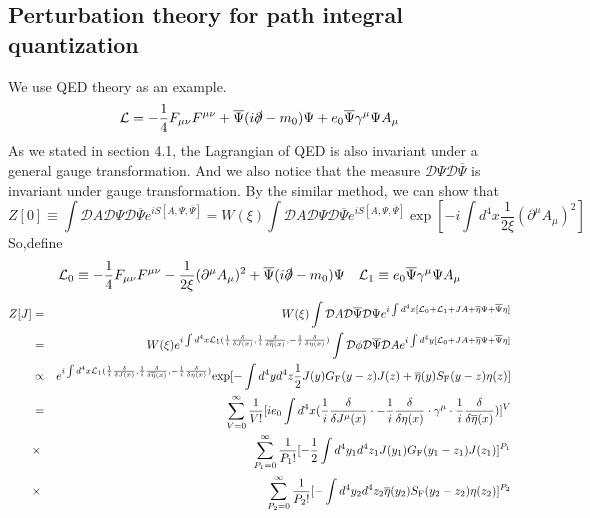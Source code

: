 \subsection{Perturbation theory for path integral quantization}
\noindent
We use QED theory as an example.
\[\mathcal{L} = -\frac{1}{4}F_{\mu\nu}F^{\mu\nu} + \overline{\Psi} (i\slashed{\partial}-m_0) \Psi + e_0\overline{\Psi}\gamma^{\mu}\Psi A_{\mu}\]
As we stated in section 4.1, the Lagrangian of QED is also invariant under a general gauge transformation. And we also notice that the measure $\mathcal{D}\Psi \mathcal{D}\overline{\Psi}$ is invariant under gauge transformation. By the similar method, we can show that
\[Z[0] \equiv \int \mathcal{D}A \mathcal{D}\Psi \mathcal{D}\overline{\Psi}e^{iS[A,\Psi,\overline{\Psi}]} = W(\xi)\int \mathcal{D}A \mathcal{D}\Psi \mathcal{D}\overline{\Psi}e^{iS[A,\Psi,\overline{\Psi}]} \exp\left[ -i \int d^4x \frac{1}{2\xi} (\partial^{\mu}A_{\mu})^2\right] \]
So,define
\[\mathcal{L}_0 \equiv -\frac{1}{4}F_{\mu\nu}F^{\mu\nu} - \frac{1}{2\xi} (\partial^{\mu}A_{\mu})^2 + \overline{\Psi} (i\slashed{\partial}-m_0) \Psi \quad \mathcal{L}_1 \equiv e_0\overline{\Psi}\gamma^{\mu}\Psi A_{\mu}\]
\begin{eqnarray}
Z[J] &=& W(\xi) \int \mathcal{D}A \mathcal{D}\overline{\Psi} \mathcal{D}\Psi e^{i\int d^4x [\mathcal{L}_0 + \mathcal{L}_1 + JA + \overline{\eta}\Psi + \overline{\Psi}\eta]} \nonumber \\
&=& W(\xi) e^{i\int d^4x \mathcal{L}_1(\frac{1}{i} \frac{\delta}{\delta J(x)},\frac{1}{i}\frac{\delta}{\delta \overline{\eta}(x)},-\frac{1}{i}\frac{\delta}{\delta \eta(x)})} \int \mathcal{D}\phi \mathcal{D}\overline{\Psi} \mathcal{D}A e^{i\int d^4y [\mathcal{L}_0 + JA + \overline{\eta}\Psi + \overline{\Psi}\eta]} \nonumber \\
&\propto & e^{i\int d^4x \mathcal{L}_1(\frac{1}{i} \frac{\delta}{\delta J(x)},\frac{1}{i}\frac{\delta}{\delta \overline{\eta}(x)},-\frac{1}{i}\frac{\delta}{\delta \eta(x)})} \mathrm{exp} [- \int d^4y d^4z  \frac{1}{2} J(y)G_{\rm F}(y-z)J(z) + \overline{\eta}(y)S_{\rm F}(y-z)\eta(z)] \nonumber \\
& =& \sum_{V=0}^{\infty} \frac{1}{V!} [ie_0 \int d^4x (\frac{1}{i} \frac{\delta}{\delta J^{\mu}(x)} \cdot -\frac{1}{i}\frac{\delta}{\delta \eta(x)} \cdot \gamma^{\mu} \cdot  \frac{1}{i}\frac{\delta}{\delta \overline{\eta}(x)})]^V \nonumber \\
&\times & \sum_{P_1=0}^{\infty} \frac{1}{P_1!} [-\frac{1}{2} \int d^4y_1 d^4z_1 J(y_1)G_{\rm F}(y_1-z_1)J(z_1)]^{P_1} \nonumber \\
&\times &  \sum_{P_2=0}^{\infty} \frac{1}{P_2!} [-\int d^4y_2 d^4z_2 \overline{\eta}(y_2)S_{\rm F}(y_2-z_2)\eta(z_2)]^{P_2} \nonumber
\end{eqnarray}
